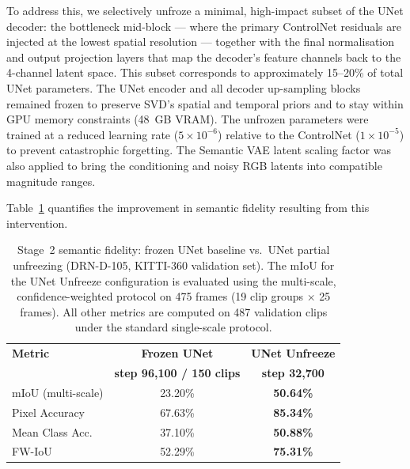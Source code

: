 To address this, we selectively unfroze a minimal, high-impact subset of the UNet decoder: the bottleneck mid-block — where the primary ControlNet residuals are injected at the lowest spatial resolution — together with the final normalisation and output projection layers that map the decoder's feature channels back to the 4-channel latent space. This subset corresponds to approximately 15--20\% of total UNet parameters. The UNet encoder and all decoder up-sampling blocks remained frozen to preserve SVD's spatial and temporal priors and to stay within GPU memory constraints (48~GB VRAM). The unfrozen parameters were trained at a reduced learning rate ($5 \times 10^{-6}$) relative to the ControlNet ($1 \times 10^{-5}$) to prevent catastrophic forgetting. The Semantic VAE latent scaling factor was also applied to bring the conditioning and noisy RGB latents into compatible magnitude ranges.

Table~\ref{tab:unet_unfreeze_comparison} quantifies the improvement in semantic fidelity resulting from this intervention.

\begin{table}[t]
    \centering
    \caption{Stage~2 semantic fidelity: frozen UNet baseline vs.\ UNet partial unfreezing (DRN-D-105, KITTI-360 validation set). The mIoU for the UNet Unfreeze configuration is evaluated using the multi-scale, confidence-weighted protocol on 475 frames (19 clip groups $\times$ 25 frames). All other metrics are computed on 487 validation clips under the standard single-scale protocol.}
    \label{tab:unet_unfreeze_comparison}
    \begin{tabular}{lcc}
        \toprule
        \textbf{Metric} & \textbf{Frozen UNet} & \textbf{UNet Unfreeze} \\
                        & \textbf{step 96,100 / 150 clips} & \textbf{step 32,700} \\
        \midrule
        mIoU (multi-scale)   & 23.20\% & \textbf{50.64\%} \\
        Pixel Accuracy       & 67.63\% & \textbf{85.34\%} \\
        Mean Class Acc.      & 37.10\% & \textbf{50.88\%} \\
        FW-IoU               & 52.29\% & \textbf{75.31\%} \\
        \bottomrule
    \end{tabular}
\end{table}


